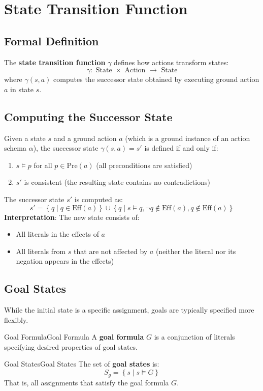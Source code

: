 \documentclass[a4paper]{article}
\theoremstyle{definition}
\begin{document}
\section{State Transition Function}
\subsection{Formal Definition}
The \textbf{state transition function} \( \gamma \) defines how actions transform states:
\[
  \gamma : \text{ State } \times \text{ Action } \rightarrow \text{ State}
\]
where \( \gamma(s,a) \) computes the successor state obtained by executing ground action \( a \) in state \( s \).
\subsection{Computing the Successor State}
Given a state \( s \) and a ground action \( a \) (which is a ground instance of an action schema \( \alpha \)), the 
successor state \( \gamma(s,a) = s'\) is defined if and only if:
\begin{enumerate}
    \item \( s \models p \) for all \( p \in \mathrm{Pre}(a) \) (all preconditions are satisfied)
    \item \( s' \) is consistent (the resulting state contains no contradictions)
\end{enumerate}
The successor state \( s' \) is computed as:
\[
  s' = \left\{ q \;|\; q \in \mathrm{Eff}(a) \right\} \cup \left\{ q \;|\; s \models q, \lnot q \notin \mathrm{Eff}(a), q \notin \mathrm{Eff}(a) \right\}
\]
\textbf{Interpretation}: The new state consists of:
\begin{itemize}
    \item All literals in the effects of $a$
    \item All literals from $s$ that are not affected by $a$ (neither the literal nor its negation appears in the effects)
\end{itemize}
\subsection{Goal States}
While the initial state is a specific assignment, goals are typically specified more flexibly.
\begin{definition}{Goal Formula}{Goal Formula}
A \textbf{goal formula} \( G \) is a conjunction of literals specifying desired properties of goal states.
\end{definition}
\begin{definition}{Goal States}{Goal States}
The set of \textbf{goal states} is:
\[
  S_g = \left\{ s \;|\; s \models G \right\}
\]
That is, all assignments that satisfy the goal formula \( G \).
\end{definition}
\end{document}
